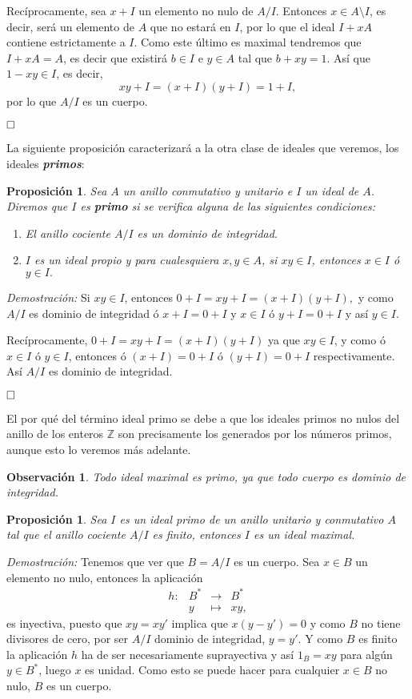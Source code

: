 \documentclass[12pt]{article}
\newtheorem{proposition}[theorem]{Proposición}
\newtheorem{observation}{Observación}[theorem]
\begin{document}
Recíprocamente, sea $x + I$ un elemento no nulo de $A/I$. Entonces $x \in A \setminus I$, es decir, será un elemento de $A$ que no estará en $I$, por lo que el ideal $I + xA$ contiene estrictamente a $I$. Como este último es maximal tendremos que $I + xA = A$, es decir que existirá $b \in I$ e $y \in A$ tal que $b + xy = 1$. Así que $1 - xy \in I$, es decir, $$xy + I = (x + I)(y + I ) = 1 + I,$$ por lo que $A/I$ es un cuerpo.

$\hfill \square$

La siguiente proposición caracterizará a la otra clase de ideales que veremos, los ideales \textbf{\textit{primos}}:

\begin{proposition} Sea $A$ un anillo conmutativo y unitario e $I$ un ideal de $A$. Diremos que $I$ es \textbf{primo} si se verifica alguna de las siguientes condiciones: \begin{enumerate}
\item El anillo cociente $A/I$ es un dominio de integridad.
\item $I$ es un ideal propio y para cualesquiera $x, y \in A$, si $xy \in I$, entonces $x \in I$ ó $y \in I.$
\end{enumerate}
\end{proposition}
\emph{Demostración: } Si $xy \in I$, entonces $0 + I = xy + I = (x + I)(y + I),$ y como $A/I$ es dominio de integridad ó $x + I = 0 + I$ y $x \in I$ ó $y + I = 0 + I$ y así $y \in I$.

Recíprocamente, $0 + I = xy + I = (x+ I)( y + I)$ ya que $xy \in I$, y como ó $x \in I$ ó $y \in I$, entonces ó $(x + I)=  0 + I$ ó $(y + I) = 0 + I$ respectivamente. Así $A/I$ es dominio de integridad.

$\hfill \square$

El por qué del término ideal primo se debe a que los ideales primos no nulos del anillo de los enteros $\mathbb{Z}$ son precisamente los generados por los números primos, aunque esto lo veremos más adelante.

\begin{observation} Todo ideal maximal es primo, ya que todo cuerpo es dominio de integridad.
\end{observation}

\begin{proposition} Sea $I$ es un ideal primo de un anillo unitario y conmutativo $A$ tal que el anillo cociente $A/I$ es finito, entonces $I$ es un ideal maximal.
\end{proposition}
\emph{Demostración: } Tenemos que ver que $ B = A/I$ es un cuerpo. Sea $x \in B$ un elemento no nulo, entonces la aplicación $$\begin{array}{rccl}
h \colon &B^{\ast}&\longrightarrow &B^{\ast} \\
&y& \longmapsto &xy,
\end{array}
$$ es inyectiva, puesto que $xy = xy'$ implica que $x(y-y') =0$ y como $B$ no tiene divisores de cero, por ser $A/I$ dominio de integridad, $y = y'$. Y como $B$ es finito la aplicación $h$ ha de ser necesariamente suprayectiva y así $1_{B} = xy$ para algún $y \in B^{\ast}$, luego $x$ es unidad. Como esto se puede hacer para cualquier $x \in B$ no nulo, $B$ es un cuerpo.
\end{document}
